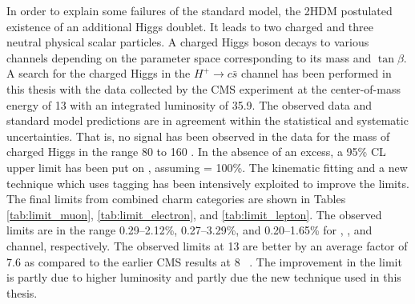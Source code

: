 
In order to explain some failures of the standard model, the 2HDM postulated 
existence of an additional Higgs doublet. It leads to two charged and three neutral
physical scalar particles. A charged Higgs boson 
decays to various channels depending on the parameter space corresponding to its mass and 
$\tan\beta$. A search for the charged Higgs in the $H^+ \to c\bar{s}$ channel has been 
performed in this thesis with the data collected by the CMS experiment at the center-of-mass 
energy of 13 \TeV with an integrated luminosity of 35.9\fbinv. The observed data and 
standard model predictions are in agreement within the statistical and systematic uncertainties. 
That is, no signal has been observed in the data for the mass of charged Higgs in the range
80 to 160 \GeV. In the absence of an excess, a 95\% CL upper limit has been put on \brThb, 
assuming \brHcs = 100\%. The kinematic fitting and a new technique which uses \PQc tagging has 
been intensively exploited to improve the limits. The final limits from combined charm categories 
are shown in Tables \ref{tab:limit_muon}, \ref{tab:limit_electron}, and \ref{tab:limit_lepton}. 
The observed limits are in the range 0.29--2.12\%, 0.27--3.29\%, and 0.20--1.65\% for 
\mujets, \ejets, and \ljets channel, respectively. The observed limits at 13 \TeV are better 
by an average factor of 7.6 as compared to the earlier CMS results at 8 \TeV~\cite{Khachatryan:2015uua}.
The improvement in the limit is partly due to higher luminosity and partly due the new technique 
used in this thesis. 

